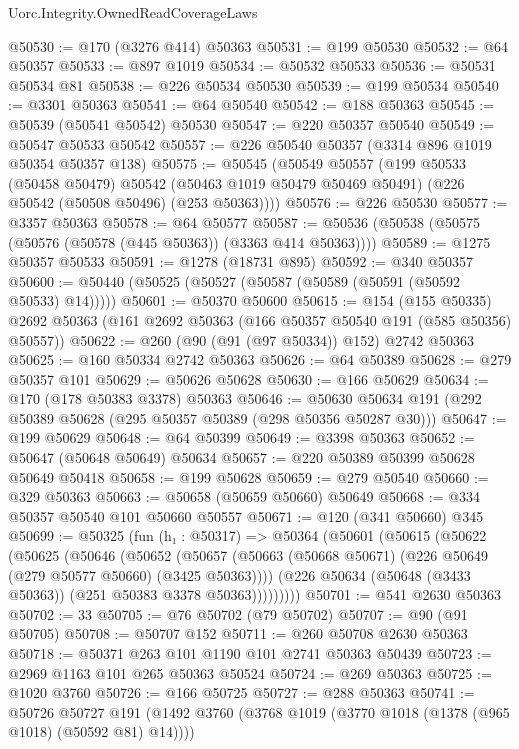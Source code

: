 \begin{lexlean}{Uorc.Integrity.OwnedReadCoverageLaws}
\begin{coremodule}
@50530 := @170 (@3276 @414) @50363
@50531 := @199 @50530
@50532 := @64 @50357
@50533 := @897 @1019
@50534 := @50532 @50533
@50536 := @50531 @50534 @81
@50538 := @226 @50534 @50530
@50539 := @199 @50534
@50540 := @3301 @50363
@50541 := @64 @50540
@50542 := @188 @50363
@50545 := @50539 (@50541 @50542) @50530
@50547 := @220 @50357 @50540
@50549 := @50547 @50533 @50542
@50557 := @226 @50540 @50357 (@3314 @896 @1019 @50354 @50357 @138)
@50575 := @50545
    (@50549
      @50557
      (@199
        @50533
        (@50458 @50479)
        @50542
        (@50463 @1019 @50479 @50469 @50491)
        (@226 @50542 (@50508 @50496) (@253 @50363))))
@50576 := @226 @50530
@50577 := @3357 @50363
@50578 := @64 @50577
@50587 := @50536 (@50538 (@50575 (@50576 (@50578 (@445 @50363)) (@3363 @414 @50363))))
@50589 := @1275 @50357 @50533
@50591 := @1278 (@18731 @895)
@50592 := @340 @50357
@50600 := @50440 (@50525 (@50527 (@50587 (@50589 (@50591 (@50592 @50533) @14)))))
@50601 := @50370 @50600
@50615 := @154
    (@155 @50335)
    @2692
    @50363
    (@161 @2692 @50363 (@166 @50357 @50540 @191 (@585 @50356) @50557))
@50622 := @260 (@90 (@91 (@97 @50334)) @152) @2742 @50363
@50625 := @160 @50334 @2742 @50363
@50626 := @64 @50389
@50628 := @279 @50357 @101
@50629 := @50626 @50628
@50630 := @166 @50629
@50634 := @170 (@178 @50383 @3378) @50363
@50646 := @50630 @50634 @191 (@292 @50389 @50628 (@295 @50357 @50389 (@298 @50356 @50287 @30)))
@50647 := @199 @50629
@50648 := @64 @50399
@50649 := @3398 @50363
@50652 := @50647 (@50648 @50649) @50634
@50657 := @220 @50389 @50399 @50628 @50649 @50418
@50658 := @199 @50628
@50659 := @279 @50540
@50660 := @329 @50363
@50663 := @50658 (@50659 @50660) @50649
@50668 := @334 @50357 @50540 @101 @50660 @50557
@50671 := @120 (@341 @50660) @345
@50699 := @50325
    (fun (h₁ : @50317) =>
    @50364
      (@50601
        (@50615
          (@50622
            (@50625
              (@50646
                (@50652
                  (@50657
                    (@50663 (@50668 @50671) (@226 @50649 (@279 @50577 @50660) (@3425 @50363))))
                  (@226 @50634 (@50648 (@3433 @50363)) (@251 @50383 @3378 @50363)))))))))
@50701 := @541 @2630 @50363
@50702 := 33
@50705 := @76 @50702 (@79 @50702)
@50707 := @90 (@91 @50705)
@50708 := @50707 @152
@50711 := @260 @50708 @2630 @50363
@50718 := @50371 @263 @101 @1190 @101 @2741 @50363 @50439
@50723 := @2969 @1163 @101 @265 @50363 @50524
@50724 := @269 @50363
@50725 := @1020 @3760
@50726 := @166 @50725
@50727 := @288 @50363
@50741 := @50726
    @50727
    @191
    (@1492 @3760 (@3768 @1019 (@3770 @1018 (@1378 (@965 @1018) (@50592 @81) @14))))

\end{coremodule}
\end{lexlean}
